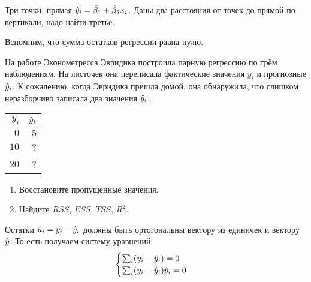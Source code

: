 \begin{problem}
Три точки, прямая $\hat{y}_i = \hat{\beta}_1 + \hat{\beta}_2 x_i$. Даны два расстояния от точек до прямой по вертикали, надо найти третье.
\begin{sol}
Вспомним, что сумма остатков регрессии равна нулю.
\end{sol}
\end{problem}

\begin{problem}
На работе Эконометресса Эвридика построила парную регрессию по трём наблюдениям. На листочек она переписала фактические значения $y_i$ и прогнозные $\hat{y}_i$. К сожалению, когда Эвридика пришла домой, она обнаружила, что слишком неразборчиво записала два значения $\hat{y}_i$:

\begin{tabular}{rr}
\toprule
$y_i$ & $\hat{y}_i$ \\
\midrule
$0$ & $5$ \\
$10$ & ? \\
$20$ & ? \\
\bottomrule
\end{tabular}

\begin{enumerate}
\item Восстановите пропущенные значения.
\item Найдите $RSS$, $ESS$, $TSS$, $R^2$.
\end{enumerate}


\begin{sol}
Остатки $\hat u_i = y_i - \hat{y}_i$ должны быть ортогональны вектору из единичек и вектору $\hat{y}$. То есть получаем систему уравнений
\[
\begin{cases}
\sum_i (y_i - \hat{y}_i) = 0 \\
\sum_i (y_i - \hat{y}_i) \hat{y}_i = 0 \\
\end{cases}
\]

\end{sol}
\end{problem}

